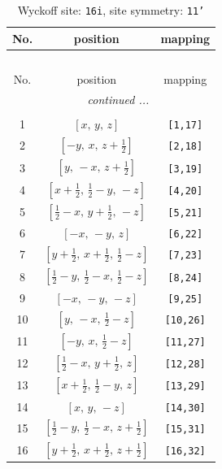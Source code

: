 \documentclass[fleqn,8pt]{jsarticle}
\begin{document}
\begin{longtable}{ccc}
\caption{Wyckoff site: {\tt 16i}, site symmetry: {\tt 11'}}
 \\
 \hline \hline
No. & position & mapping \\ \hline \endfirsthead

\multicolumn{2}{l}{\tablename\ \thetable{}} \\
 \hline \hline
No. & position & mapping \\ \hline \endhead

 \hline \hline
\multicolumn{2}{r}{\footnotesize\it continued ...} \\ \endfoot

 \hline \hline
\multicolumn{2}{r}{} \\ \endlastfoot

1 & $\left[ x,\, y,\, z \right]$ & {\tt [1,17]} \\ \hline
2 & $\left[ - y,\, x,\, z + \frac{1}{2} \right]$ & {\tt [2,18]} \\ \hline
3 & $\left[ y,\, - x,\, z + \frac{1}{2} \right]$ & {\tt [3,19]} \\ \hline
4 & $\left[ x + \frac{1}{2},\, \frac{1}{2} - y,\, - z \right]$ & {\tt [4,20]} \\ \hline
5 & $\left[ \frac{1}{2} - x,\, y + \frac{1}{2},\, - z \right]$ & {\tt [5,21]} \\ \hline
6 & $\left[ - x,\, - y,\, z \right]$ & {\tt [6,22]} \\ \hline
7 & $\left[ y + \frac{1}{2},\, x + \frac{1}{2},\, \frac{1}{2} - z \right]$ & {\tt [7,23]} \\ \hline
8 & $\left[ \frac{1}{2} - y,\, \frac{1}{2} - x,\, \frac{1}{2} - z \right]$ & {\tt [8,24]} \\ \hline
9 & $\left[ - x,\, - y,\, - z \right]$ & {\tt [9,25]} \\ \hline
10 & $\left[ y,\, - x,\, \frac{1}{2} - z \right]$ & {\tt [10,26]} \\ \hline
11 & $\left[ - y,\, x,\, \frac{1}{2} - z \right]$ & {\tt [11,27]} \\ \hline
12 & $\left[ \frac{1}{2} - x,\, y + \frac{1}{2},\, z \right]$ & {\tt [12,28]} \\ \hline
13 & $\left[ x + \frac{1}{2},\, \frac{1}{2} - y,\, z \right]$ & {\tt [13,29]} \\ \hline
14 & $\left[ x,\, y,\, - z \right]$ & {\tt [14,30]} \\ \hline
15 & $\left[ \frac{1}{2} - y,\, \frac{1}{2} - x,\, z + \frac{1}{2} \right]$ & {\tt [15,31]} \\ \hline
16 & $\left[ y + \frac{1}{2},\, x + \frac{1}{2},\, z + \frac{1}{2} \right]$ & {\tt [16,32]} \\
\end{longtable}
\end{document}
